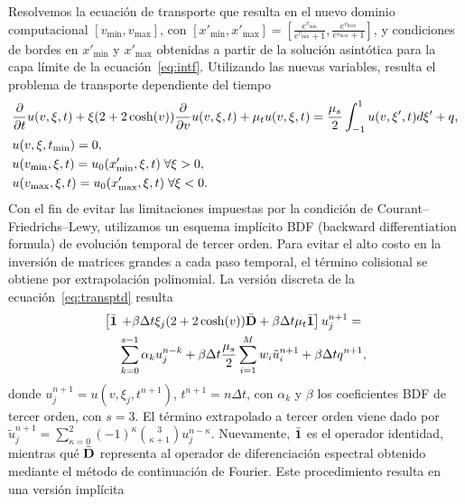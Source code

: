 Resolvemos la ecuación de transporte que resulta en el nuevo dominio computacional
$[v_{\text{min}},v_{\text{max}}]$, con 
$[x'_{\text{min}},x'_{\text{max}}]=[\frac{e^{v_{\text{min}}}}{e^{v_{\text{min}}}+1},
\frac{e^{v_{\text{max}}}}{e^{v_{\text{max}}}+1}]$, 
y condiciones de bordes en $x'_{\text{min}}$ y $x'_{\text{max}}$ 
obtenidas a partir de la solución asintótica para la capa límite 
de la ecuación~\eqref{eq:intf}. Utilizando las nuevas variables, 
resulta el problema de transporte dependiente del tiempo
\begin{equation}
\begin{split}
&\frac{\partial}{\partial t}u(v,\xi,t)+\xi(2+2\cosh(v)) \frac{\partial}{\partial v}u(v,\xi,t)+
\mu_tu(v,\xi,t)=\frac{\mu_s}{2} \int_{-1}^{1} u(v,\xi',t) d\xi'+q, \\
&u(v,\xi,t_{\text{min}})=0,\\
&u(v_{\text{min}},\xi,t)=u_{0}(x'_{\text{min}},\xi,t) \; \forall \xi>0,\\
&u(v_{\text{max}},\xi,t)=u_{0}(x'_{\text{max}},\xi,t) \; \forall \xi<0.
\end{split}
\label{eq:transptd}
\end{equation}
Con el fin de evitar las
limitaciones impuestas por la condición de Courant–Friedrichs–Lewy, utilizamos un 
esquema implícito BDF (backward differentiation formula) de evolución temporal de tercer orden. 
Para evitar el alto costo en la inversión de matrices grandes a 
cada paso temporal, el término 
colisional se obtiene por extrapolación polinomial. La versión discreta 
de la ecuación~\eqref{eq:transptd} resulta
\begin{equation*}
\begin{aligned}
 \left[ \bar{\mathbf{1}} \right. & \left.+ \beta\Delta t\xi_j (2+2\cosh(v)) \bar{\mathbf{D}} + \beta\Delta t \mu_t \bar{\mathbf{1}} \right]  
 u^{n+1}_j  = \\
&\sum_{k=0}^{s-1}\alpha_k u_j^{n-k} + \beta\Delta t \frac{\mu_s}{2}
 \sum_{i=1}^{M} w_i \tilde{u}_i^{n+1} + \beta\Delta t q^{n+1},
\end{aligned}
\label{eq:transptd1disc}
\end{equation*}
donde $u^{n+1}_j=u(v,\xi_j,t^{n+1})$, $t^{n+1}=n\Delta t$, con $\alpha_k$ y $\beta$ 
los coeficientes BDF de tercer orden, con $s=3$. El término extrapolado 
a tercer orden viene dado por $\tilde{u}_j^{n+1}=\sum_{\kappa=0}^{2}(-1)^\kappa {3 \choose \kappa+1} u_j^{n-\kappa}$. Nuevamente, 
$\bar{\mathbf{1}}$ es el operador identidad, mientras qué $\bar{\mathbf{D}}$ representa al operador 
de diferenciación espectral obtenido mediante el método de continuación de Fourier. Este procedimiento resulta en una versión implícita 

